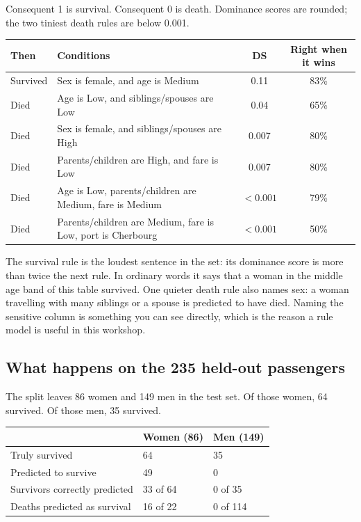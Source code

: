 \documentclass[11pt]{article}
\newcommand{\pct}[1]{\mbox{#1\%}}
\begin{document}
Consequent 1 is survival. Consequent 0 is death. Dominance scores are rounded; the two tiniest death rules are below 0.001.

\begin{table}[H]
\centering
\small
\begin{tabularx}{\textwidth}{@{}l Y c c@{}}
\toprule
Then & Conditions & DS & Right when it wins \\
\midrule
{}
Survived & Sex is female, and age is Medium & 0.11 & \pct{83} \\
Died & Age is Low, and siblings/spouses are Low & 0.04 & \pct{65} \\
Died & Sex is female, and siblings/spouses are High & 0.007 & \pct{80} \\
Died & Parents/children are High, and fare is Low & 0.007 & \pct{80} \\
Died & Age is Low, parents/children are Medium, fare is Medium & \(<0.001\) & \pct{79} \\
Died & Parents/children are Medium, fare is Low, port is Cherbourg & \(<0.001\) & \pct{50} \\
\bottomrule
\end{tabularx}
\end{table}

The survival rule is the loudest sentence in the set: its dominance score is more than twice the next rule. In ordinary words it says that a woman in the middle age band of this table survived. One quieter death rule also names sex: a woman travelling with many siblings or a spouse is predicted to have died. Naming the sensitive column is something you can see directly, which is the reason a rule model is useful in this workshop.

\subsection{What happens on the 235 held-out passengers}

The split leaves 86 women and 149 men in the test set. Of those women, 64 survived. Of those men, 35 survived.

\begin{table}[H]
\centering
\small
\begin{tabularx}{\textwidth}{@{}l Y Y@{}}
\toprule
 & Women (86) & Men (149) \\
\midrule
Truly survived & 64 & 35 \\
Predicted to survive & 49 & 0 \\
Survivors correctly predicted & 33 of 64 & 0 of 35 \\
Deaths predicted as survival & 16 of 22 & 0 of 114 \\
\bottomrule
\end{tabularx}
\end{table}
\end{document}
